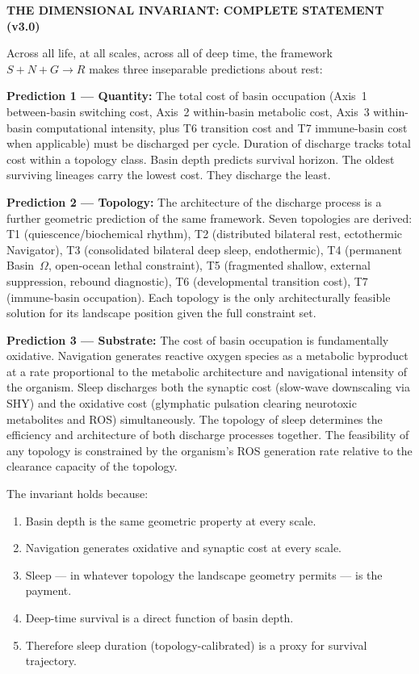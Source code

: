 \documentclass[10pt, a4paper]{article}
\begin{document}
\begin{mdframed}[
  backgroundcolor=invariantbox,
  linecolor=headergreen,
  linewidth=1pt,
  innertopmargin=0.8em,
  innerbottommargin=0.8em,
  innerleftmargin=1.0em,
  innerrightmargin=1.0em
]
\textbf{THE DIMENSIONAL INVARIANT:
COMPLETE STATEMENT (v3.0)}

\medskip
Across all life, at all scales, across
all of deep time, the framework
$S + N + G \rightarrow R$ makes three
inseparable predictions about rest:

\medskip
\textbf{Prediction 1 --- Quantity:}
The total cost of basin occupation
(Axis~1 between-basin switching cost,
Axis~2 within-basin metabolic cost,
Axis~3 within-basin computational
intensity, plus T6 transition cost and
T7 immune-basin cost when applicable)
must be discharged per cycle. Duration
of discharge tracks total cost within
a topology class. Basin depth predicts
survival horizon. The oldest surviving
lineages carry the lowest cost. They
discharge the least.

\medskip
\textbf{Prediction 2 --- Topology:}
The architecture of the discharge process
is a further geometric prediction of the
same framework. Seven topologies are
derived: T1 (quiescence/biochemical
rhythm), T2 (distributed bilateral rest,
ectothermic Navigator), T3 (consolidated
bilateral deep sleep, endothermic), T4
(permanent Basin~$\Omega$, open-ocean
lethal constraint), T5 (fragmented
shallow, external suppression, rebound
diagnostic), T6 (developmental transition
cost), T7 (immune-basin occupation).
Each topology is the only architecturally
feasible solution for its landscape
position given the full constraint set.

\medskip
\textbf{Prediction 3 --- Substrate:}
The cost of basin occupation is
fundamentally oxidative. Navigation
generates reactive oxygen species as a
metabolic byproduct at a rate proportional
to the metabolic architecture and
navigational intensity of the organism.
Sleep discharges both the synaptic cost
(slow-wave downscaling via SHY) and
the oxidative cost (glymphatic pulsation
clearing neurotoxic metabolites and ROS)
simultaneously. The topology of sleep
determines the efficiency and architecture
of both discharge processes together.
The feasibility of any topology is
constrained by the organism's ROS
generation rate relative to the clearance
capacity of the topology.

\medskip
The invariant holds because:
\begin{enumerate}[itemsep=0.1em]
  \item Basin depth is the same geometric
    property at every scale.
  \item Navigation generates oxidative
    and synaptic cost at every scale.
  \item Sleep --- in whatever topology
    the landscape geometry permits ---
    is the payment.
  \item Deep-time survival is a direct
    function of basin depth.
  \item Therefore sleep duration
    (topology-calibrated) is a proxy
    for survival trajectory.
\end{enumerate}


\end{mdframed}
\end{document}
